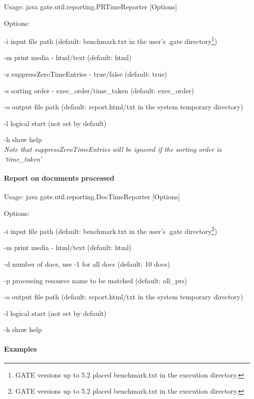 \par Usage: java gate.util.reporting.PRTimeReporter [Options]
\par Options: 
\par -i input file path (default: benchmark.txt in the user's .gate
directory\footnote{GATE versions up to 5.2 placed benchmark.txt in the
execution directory.})
\par -m print media - html/text (default: html)
\par -z suppressZeroTimeEntries - true/false (default: true)
\par -s sorting order - exec\_order/time\_taken (default: exec\_order)
\par -o output file path (default: report.html/txt in the system temporary directory)
\par -l logical start (not set by default)
\par -h show help
\\

\textit{Note that suppressZeroTimeEntries will be ignored if the
sorting order is `time\_taken'}

\paragraph{Report on documents processed}

\par Usage: java gate.util.reporting.DocTimeReporter [Options]
\par Options: 
\par -i input file path (default: benchmark.txt in the user's .gate
directory\footnote{GATE versions up to 5.2 placed benchmark.txt in the
execution directory.})
\par -m print media - html/text (default: html)
\par -d number of docs, use -1 for all docs (default: 10 docs)
\par -p processing resource name to be matched (default: all\_prs)
\par -o output file path (default: report.html/txt in the system temporary directory)
\par -l logical start (not set by default)
\par -h show help

\paragraph{Examples}

